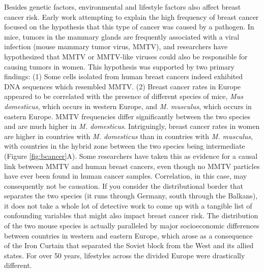 \documentclass[
]{book}
\begin{document}
Besides genetic factors, environmental and lifestyle factors also affect breast cancer risk. Early work attempting to explain the high frequency of breast cancer focused on the hypothesis that this type of cancer was caused by a pathogen. In mice, tumors in the mammary glands are frequently associated with a viral infection (mouse mammary tumor virus, MMTV), and researchers have hypothesized that MMTV or MMTV-like viruses could also be responsible for causing tumors in women. This hypothesis was supported by two primary findings: (1) Some cells isolated from human breast cancers indeed exhibited DNA sequences which resembled MMTV. (2) Breast cancer rates in Europe appeared to be correlated with the presence of different species of mice, \emph{Mus domesticus}, which occurs in western Europe, and \emph{M. musculus}, which occurs in eastern Europe. MMTV frequencies differ significantly between the two species and are much higher in \emph{M. domesticus}. Intriguingly, breast cancer rates in women are higher in countries with \emph{M. domesticus} than in countries with \emph{M. musculus}, with countries in the hybrid zone between the two species being intermediate (Figure \ref{fig:bcancer}A). Some researchers have taken this as evidence for a causal link between MMTV and human breast cancers, even though no MMTV particles have ever been found in human cancer samples. Correlation, in this case, may consequently not be causation. If you consider the distributional border that separates the two species (it runs through Germany, south through the Balkans), it does not take a whole lot of detective work to come up with a tangible list of confounding variables that might also impact breast cancer risk. The distribution of the two mouse species is actually paralleled by major socioeconomic differences between countries in western and eastern Europe, which arose as a consequence of the Iron Curtain that separated the Soviet block from the West and its allied states. For over 50 years, lifestyles across the divided Europe were drastically different.
\end{document}
